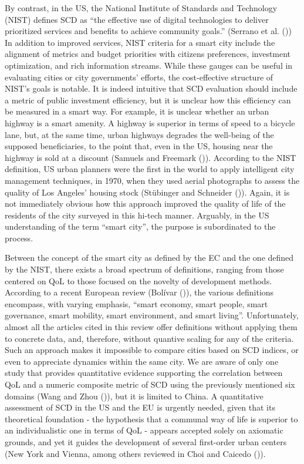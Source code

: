 \documentclass[
  english,
  12pt,
  a4paper,
]{scrartcl}
\begin{document}
By contrast, in the US, the National Institute of Standards and
Technology (NIST) defines SCD as ``the effective use of digital
technologies to deliver prioritized services and benefits to achieve
community goals.'' (Serrano et al.
()) In addition to
improved services, NIST criteria for a smart city include the alignment
of metrics and budget priorities with citizens preferences, investment
optimization, and rich information streams. While these gauges can be
useful in evaluating cities or city governments' efforts, the
cost-effective structure of NIST's goals is notable. It is indeed
intuitive that SCD evaluation should include a metric of public
investment efficiency, but it is unclear how this efficiency can be
measured in a smart way. For example, it is unclear whether an urban
highway is a smart amenity. A highway is superior in terms of speed to a
bicycle lane, but, at the same time, urban highways degrades the
well-being of the supposed beneficiaries, to the point that, even in the
US, housing near the highway is sold at a discount (Samuels and Freemark
()). According to the
NIST definition, US urban planners were the first in the world to apply
intelligent city management techniques, in 1970, when they used aerial
photographs to assess the quality of Los Angeles' housing stock
(Stübinger and Schneider
()). Again, it
is not immediately obvious how this approach improved the quality of
life of the residents of the city surveyed in this hi-tech manner.
Arguably, in the US understanding of the term ``smart city'', the
purpose is subordinated to the process.

Between the concept of the smart city as defined by the EC and the one
defined by the NIST, there exists a broad spectrum of definitions,
ranging from those centered on QoL to those focused on the novelty of
development methods. According to a recent European review (Bolívar
()), the various
definitions encompass, with varying emphasis, ``smart economy, smart
people, smart governance, smart mobility, smart environment, and smart
living''. Unfortunately, almost all the articles cited in this review
offer definitions without applying them to concrete data, and,
therefore, without quantive scaling for any of the criteria. Such an
approach makes it impossible to compare cities based on SCD indices, or
even to appreciate dynamics within the same city. We are aware of only
one study that provides quantitative evidence supporting the correlation
between QoL and a numeric composite metric of SCD using the previously
mentioned six domains (Wang and Zhou
()), but it is limited to
China. A quantitative assessment of SCD in the US and the EU is urgently
needed, given that its theoretical foundation - the hypothesis that a
communal way of life is superior to an individualistic one in terms of
QoL - appears accepted solely on axiomatic grounds, and yet it guides
the development of several first-order urban centers (New York and
Vienna, among others reviewed in Choi and Caicedo
()).
\end{document}
